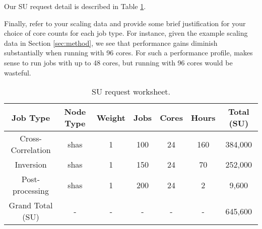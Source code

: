 \documentclass[10pt, letterpaper]{article}
\begin{document}
Our SU request detail is described in Table \ref{tab:worksheet}.

Finally, refer to your scaling data and provide some brief justification for your choice of core counts for each job type.   For instance, given the example scaling data in Section \ref{sec:method}, we see that performance gains diminish substantially when running with 96 cores.  For such a performance profile, makes sense to run jobs with up to 48 cores, but running with 96 cores would be wasteful.

\begin{table}
\centering
\begin{tabular}{| c | c | c | c | c | c | c|}
\hline
 Job Type           & Node Type & Weight & Jobs  & Cores  & Hours & Total (SU)  \\\hline
Cross-Correlation   & shas      & 1      & 100    & 24     & 160   & 384,000 \\
Inversion           & shas      & 1      & 150   & 24     & 70    & 252,000 \\ 
Post-processing     & shas      & 1      & 200   & 24     & 2     & 9,600 \\\hline
Grand Total (SU)    & -         & -      &-      & -      &-      &  645,600 \\\hline
\end{tabular}
\caption{\label{tab:worksheet}SU request worksheet.}
\end{table}


\end{document}
